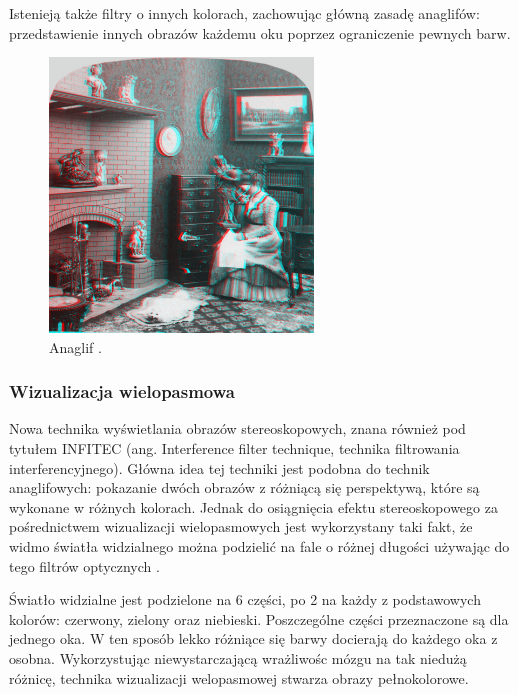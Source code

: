 Istenieją także filtry o innych kolorach, zachowując główną zasadę anaglifów: przedstawienie innych obrazów każdemu oku poprzez ograniczenie pewnych barw.

\begin{figure}[H]
		\centering
 		\includegraphics[width=7cm]{anaglif.jpg}
    	\caption{Anaglif \cite{anaglif}.}
 		\label{rys4}
\end{figure}

\subsubsection{Wizualizacja wielopasmowa}
Nowa technika wyświetlania obrazów stereoskopowych, znana również pod tytułem INFITEC (ang. Interference filter technique, technika filtrowania interferencyjnego). Główna idea tej techniki jest podobna do technik anaglifowych: pokazanie dwóch obrazów z różniącą się perspektywą, które są wykonane w różnych kolorach. Jednak do osiągnięcia efektu stereoskopowego za pośrednictwem wizualizacji wielopasmowych jest wykorzystany taki fakt, że widmo światła widzialnego można podzielić na fale o różnej długości używając do tego filtrów optycznych \cite{infitec}.

Światło widzialne jest podzielone na 6 części, po 2 na każdy z podstawowych kolorów: czerwony, zielony oraz niebieski. Poszczególne części przeznaczone są dla jednego oka. W ten sposób lekko różniące się barwy docierają do każdego oka z osobna. Wykorzystując niewystarczającą wrażliwośc mózgu na tak niedużą różnicę, technika wizualizacji welopasmowej stwarza obrazy pełnokolorowe.  


